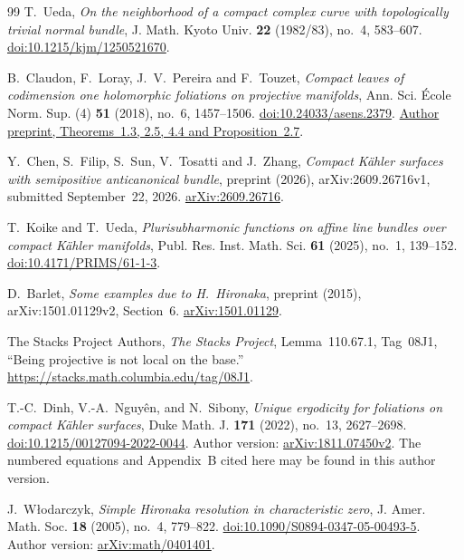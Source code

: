 \documentclass[11pt]{amsart}
\theoremstyle{definition}
\theoremstyle{remark}
\numberwithin{equation}{section}
\begin{document}
\begin{thebibliography}{99}
T.~Ueda,
\emph{On the neighborhood of a compact complex curve with topologically
trivial normal bundle},
J. Math. Kyoto Univ. \textbf{22} (1982/83), no.~4, 583--607.
\href{https://doi.org/10.1215/kjm/1250521670}{doi:10.1215/kjm/1250521670}.

B.~Claudon, F.~Loray, J.~V.~Pereira and F.~Touzet,
\emph{Compact leaves of codimension one holomorphic foliations on
projective manifolds},
Ann. Sci. \'Ecole Norm. Sup. (4) \textbf{51} (2018), no.~6, 1457--1506.
\href{https://doi.org/10.24033/asens.2379}{doi:10.24033/asens.2379}.
\href{https://arxiv.org/abs/1512.06623}{Author preprint, Theorems~1.3, 2.5, 4.4 and Proposition~2.7}.

Y.~Chen, S.~Filip, S.~Sun, V.~Tosatti and J.~Zhang,
\emph{Compact K\"ahler surfaces with semipositive anticanonical bundle},
preprint (2026), arXiv:2609.26716v1, submitted September~22, 2026.
\href{https://arxiv.org/abs/2609.26716v1}{arXiv:2609.26716}.

T.~Koike and T.~Ueda,
\emph{Plurisubharmonic functions on affine line bundles over compact
K\"ahler manifolds},
Publ. Res. Inst. Math. Sci. \textbf{61} (2025), no.~1, 139--152.
\href{https://doi.org/10.4171/PRIMS/61-1-3}{doi:10.4171/PRIMS/61-1-3}.

D.~Barlet,
\emph{Some examples due to H.~Hironaka},
preprint (2015), arXiv:1501.01129v2, Section~6.
\href{https://arxiv.org/abs/1501.01129}{arXiv:1501.01129}.

The Stacks Project Authors,
\emph{The Stacks Project},
Lemma~110.67.1, Tag~08J1, ``Being projective is not local on the base.''
\url{https://stacks.math.columbia.edu/tag/08J1}.

T.-C.~Dinh, V.-A.~Nguy\^en, and N.~Sibony,
\emph{Unique ergodicity for foliations on compact K\"ahler surfaces},
Duke Math. J. \textbf{171} (2022), no.~13, 2627--2698.
\href{https://doi.org/10.1215/00127094-2022-0044}{doi:10.1215/00127094-2022-0044}.
Author version: \href{https://arxiv.org/abs/1811.07450v2}{arXiv:1811.07450v2}.
The numbered equations and Appendix~B cited here may be found in this
author version.

J.~W{\l}odarczyk,
\emph{Simple Hironaka resolution in characteristic zero},
J. Amer. Math. Soc. \textbf{18} (2005), no.~4, 779--822.
\href{https://doi.org/10.1090/S0894-0347-05-00493-5}{doi:10.1090/S0894-0347-05-00493-5}.
Author version: \href{https://arxiv.org/abs/math/0401401}{arXiv:math/0401401}.


\end{thebibliography}
\end{document}
